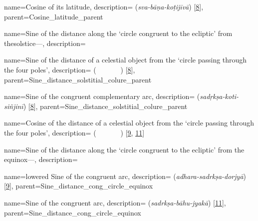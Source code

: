 {
        name={Cosine of its latitude},
        description={ (\textit{sva-bāṇa-koṭijīvā}) [\hyperlink{SEpass8}{8}]},
        parent={Cosine_latitude_parent}
}

{
        name={Sine of the distance along the `circle congruent to the ecliptic' from the\linebreak solstice---},
        description={\phantom{x}\nopagebreak}
} 

{
        name={Sine of the distance of a celestial object from the `circle passing through the four poles'},
        description={ (\jayb\idafaconsonant\ \bud\idafaconsonant\ \kawkab\ \az\ \guillemotleft\dayiri\idafavowel\ \marri\ \biaqtab\idafaconsonant\ \arbai\guillemotright) [\hyperlink{PEpass8}{8}]},
        parent={Sine_distance_solstitial_colure_parent}
}        

{
        name={Sine of the congruent complementary arc},
        description={ (\textit{sadṛkṣa-koti-siñjinī}) [\hyperlink{SEpass8}{8}]},
        parent={Sine_distance_solstitial_colure_parent}
}


{
        name={Cosine of the distance of a celestial object from the `circle passing through the four poles'},
        description={ (\jayb\idafaconsonant\ \tamam\idafaconsonant\ \bud\ \az\ \guillemotleft\dayiri\idafavowel\ \marri\ \biaqtab\idafaconsonant\ \arbai\guillemotright) [\hyperlink{PEpass9}{9}, \hyperlink{PEpass11}{11}]}
}

{
        name={Sine of the distance along the `circle congruent to the ecliptic' from the \linebreak equinox---},
        description={\phantom{x}\nopagebreak}
}

{
        name={lowered Sine of the congruent arc},
        description={ (\textit{adhara-sadrkṣa-dorjyā}) [\hyperlink{SEpass9}{9}]},
        parent={Sine_distance_cong_circle_equinox}
}

{
        name={Sine of the congruent arc},
        description={ (\textit{sadrkṣa-bāhu-jyakā}) [\hyperlink{SEpass11}{11}]},
        parent={Sine_distance_cong_circle_equinox}
}


